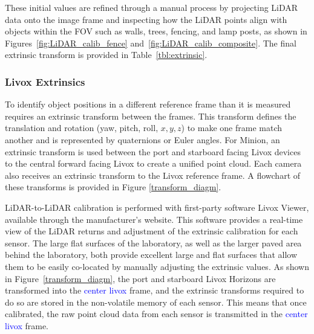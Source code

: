 These initial values are refined through a manual process by projecting LiDAR data onto the image frame and inspecting how the LiDAR points align with objects within the \ac{FOV} such as walls, trees, fencing, and lamp posts, as shown in Figures~\ref{fig:LiDAR_calib_fence} and~\ref{fig:LiDAR_calib_composite}.
The final extrinsic transform is provided in Table~\ref{tbl:extrinsic}.

            
\subsubsection{Livox Extrinsics} \label{lidar_extrinsic}
To identify object positions in a different reference frame than it is measured requires an extrinsic transform between the frames. 
This transform defines the translation and rotation (yaw, pitch, roll, $x,y,z$) to make one frame match another and is represented by quaternions or Euler angles.
For Minion, an extrinsic transform is used between the port and starboard facing Livox devices to the central forward facing Livox to create a unified point cloud. Each camera also receives an extrinsic transform to the Livox reference frame.
A flowchart of these transforms is provided in Figure \ref{transform_diagm}.



LiDAR-to-LiDAR calibration is performed with first-party software Livox Viewer, available through the manufacturer's website.
This software provides a real-time view of the LiDAR returns and adjustment of the extrinsic calibration for each sensor.
The large flat surfaces of the laboratory, as well as the larger paved area behind the laboratory, both provide excellent large and flat surfaces that allow them to be easily co-located by manually adjusting the extrinsic values.
As shown in Figure~\ref{transform_diagm}, the port and starboard Livox Horizons are transformed into the \textcolor{blue}{center livox} frame, and the extrinsic transforms required to do so are stored in the non-volatile memory of each sensor. This means that once calibrated, the raw point cloud data from each sensor is transmitted in the \textcolor{blue}{center livox} frame.




